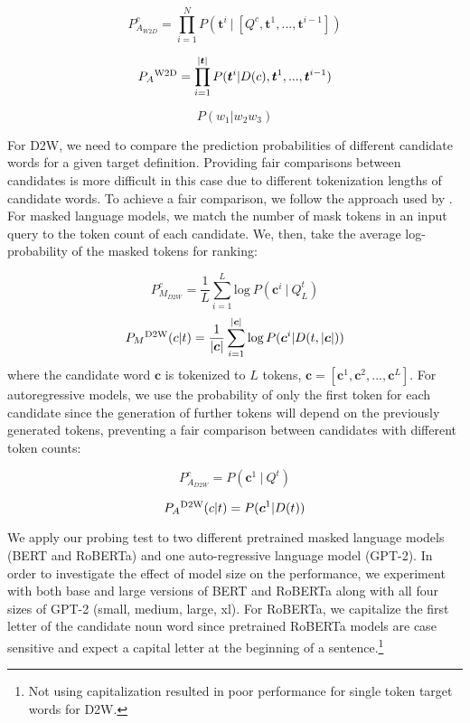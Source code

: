 \documentclass[11pt,a4paper]{article}
\def\uprm#1#2{_#2\mbox{$^{\hbox{\scriptsize #1}}$}}
\begin{document}
\begin{equation*}
    P_{A_{W2D}}^c = \prod_{i=1}^{N}P(\bm{t}^i~|~[Q^{c},\bm{t}^{1},...,\bm{t}^{i-1}])
\end{equation*}

\begin{equation*}
    P\uprm{W2D}{A} = \prod_{i=1}^{|\bm{t}|}P(\bm{t}^i|D(c),\bm{t}^{1},...,\bm{t}^{i-1})
\end{equation*}

\begin{equation*}
 P(w_1|w_2w_3)
\end{equation*}

For D2W, we need to compare the prediction probabilities of
different candidate words for a given target
definition. Providing fair comparisons between candidates is
more difficult in this case due to different tokenization
lengths of candidate words. To achieve a fair comparison, we
follow the approach used by . For masked language models, we match the number of mask tokens in an input query to the token count of each candidate. We, then, take the average log-probability of the masked tokens for ranking:

\begin{equation*}
    P_{M_{D2W}}^c = \frac{1}{L}\sum_{i=1}^{L}\text{log}~P(\bm{c}^i~|~Q_{L}^{t})
\end{equation*}
\begin{equation*}
    P\uprm{D2W}{M}(c|t) =
    \frac{1}{|\bm{c}|}\sum_{i=1}^{|\bm{c}|}\log P(\bm{c}^i |
    D(t,|\bm{c}|))
\end{equation*}
where the candidate word $\bm{c}$ is tokenized to $L$ tokens, $\bm{c} = [\bm{c}^1, \bm{c}^2,...,\bm{c}^L]$. For autoregressive models, we use the probability of only the first token for each candidate since the generation of further tokens will depend on the previously generated tokens, preventing a fair comparison between candidates with different token counts:

\begin{equation*}
    P_{A_{D2W}}^c = P(\bm{c}^1~|~Q^{t})
\end{equation*}

\begin{equation*}
    P\uprm{D2W}{A}(c|t) =
     P(\bm{c}^1 |
    D(t))
\end{equation*}

We apply our probing test to two different pretrained
masked language models (BERT and
RoBERTa) and one auto-regressive language model
(GPT-2). 
In order to investigate the effect of model
size on the performance, we experiment with both
base and large versions of BERT and RoBERTa
along with all four sizes of GPT-2 (small, medium,
large, xl). 
For RoBERTa, we capitalize the first letter of the candidate
noun word since pretrained RoBERTa models are case sensitive
and expect a capital letter at the beginning of a
sentence.\footnote{Not using capitalization  resulted in
  poor performance for single token target words for D2W.}
\end{document}
